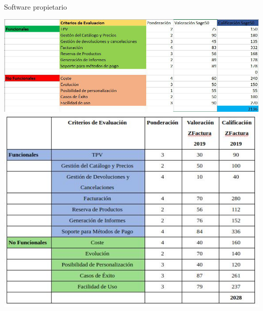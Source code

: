 \documentclass{beamer}
\begin{document}

\begin{frame}{Software propietario}

	\begin{center}
		\includegraphics[scale=0.3]{imagenes/Sage50.jpg}
		\includegraphics[scale=0.3]{imagenes/EvaluacionZFactura.jpg}
	\end{center}
	
\end{frame}



\end{document}
